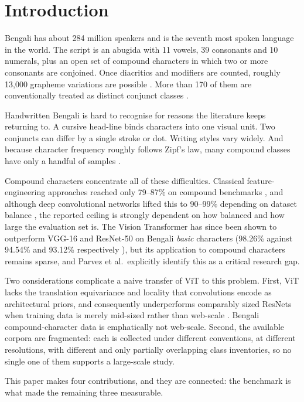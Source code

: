 \hypertarget{introduction}{%
\section{Introduction}\label{introduction}}

Bengali has about 284 million speakers \citep{ekushnetnote} and is the seventh most spoken language in the world. The script is an abugida with 11 vowels, 39 consonants and 10 numerals, plus an open set of compound characters in which two or more consonants are conjoined. Once diacritics and modifiers are counted, roughly 13,000 grapheme variations are possible \citep{ref30,ref32}. More than 170 of them are conventionally treated as distinct conjunct classes \citep{ref7}.

Handwritten Bengali is hard to recognise for reasons the literature keeps returning to. A cursive head-line binds characters into one visual unit. Two conjuncts can differ by a single stroke or dot. Writing styles vary widely. And because character frequency roughly follows Zipf's law, many compound classes have only a handful of samples \citep{ref33}.

Compound characters concentrate all of these difficulties. Classical
feature-engineering approaches reached only 79--87\% on compound
benchmarks \citep{ref2,ref3,ref4,ref5}, and although deep convolutional networks
lifted this to 90--99\% depending on dataset balance \citep{ref9,ref16,ref23}, the reported ceiling is strongly dependent on how balanced and
how large the evaluation set is. The Vision Transformer \citep{ref22} has
since been shown to outperform VGG-16 and ResNet-50 on Bengali
\emph{basic} characters (98.26\% against 94.54\% and 93.12\%
respectively \citep{ref17}), but its application to compound characters
remains sparse, and Parvez et al.~explicitly identify this as a critical
research gap.

Two considerations complicate a naive transfer of
ViT to this problem. First, ViT lacks the translation
equivariance and locality that convolutions encode
as architectural priors, and consequently underperforms comparably sized ResNets when training data
is merely mid-sized rather than web-scale \citep{ref22}. Bengali compound-character data
is emphatically not web-scale. Second, the available
corpora are fragmented: each is collected under
different conventions, at different resolutions, with
different and only partially overlapping class inventories, so no single one of them supports a large-scale
study.

This paper makes four contributions, and they are
connected: the benchmark is what made the remaining three measurable.

